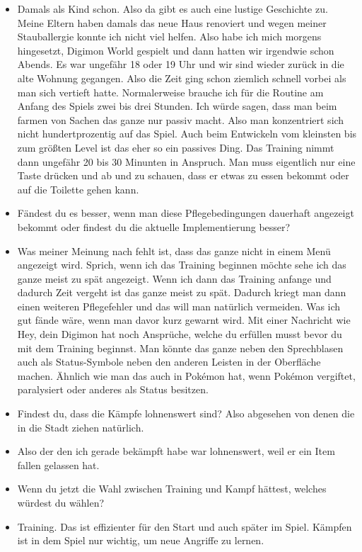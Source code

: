 {\begin{itemize}[]
    \item {} Damals als Kind schon. Also da gibt es auch eine lustige Geschichte zu. Meine Eltern haben damals das neue Haus renoviert und wegen meiner Stauballergie konnte ich nicht viel helfen. Also habe ich mich morgens hingesetzt, Digimon World gespielt und dann hatten wir irgendwie schon Abends. Es war ungefähr 18 oder 19 Uhr und wir sind wieder zurück in die alte Wohnung gegangen. Also die Zeit ging schon ziemlich schnell vorbei als man sich vertieft hatte. Normalerweise brauche ich für die Routine am Anfang des Spiels zwei bis drei Stunden. Ich würde sagen, dass man beim farmen von Sachen das ganze nur passiv macht. Also man konzentriert sich nicht hundertprozentig auf das Spiel. Auch beim Entwickeln vom kleinsten bis zum größten Level ist das eher so ein passives Ding. Das Training nimmt dann ungefähr 20 bis 30 Minunten in Anspruch. Man muss eigentlich nur eine Taste drücken und ab und zu schauen, dass er etwas zu essen bekommt oder auf die Toilette gehen kann. 
    \item {} Fändest du es besser, wenn man diese Pflegebedingungen dauerhaft angezeigt bekommt oder findest du die aktuelle Implementierung besser?
    \item {} Was meiner Meinung nach fehlt ist, dass das ganze nicht in einem Menü angezeigt wird. Sprich, wenn ich das Training beginnen möchte sehe ich das ganze meist zu spät angezeigt. Wenn ich dann das Training anfange und dadurch Zeit vergeht ist das ganze meist zu spät. Dadurch kriegt man dann einen weiteren Pflegefehler und das will man natürlich vermeiden. Was ich gut fände wäre, wenn man davor kurz gewarnt wird. Mit einer Nachricht wie \frq Hey, dein Digimon hat noch Ansprüche, welche du erfüllen musst bevor du mit dem Training beginnst\flq{}. Man könnte das ganze neben den Sprechblasen auch als Status-Symbole neben den anderen Leisten in der Oberfläche machen. Ähnlich wie man das auch in Pokémon hat, wenn Pokémon vergiftet, paralysiert oder anderes als Status besitzen. 
    \item {} Findest du, dass die Kämpfe lohnenswert sind? Also abgesehen von denen die in die Stadt ziehen natürlich.
    \item {} Also der den ich gerade bekämpft habe war lohnenswert, weil er ein Item fallen gelassen hat.
    \item {} Wenn du jetzt die Wahl zwischen Training und Kampf hättest, welches würdest du wählen? 
    \item {} Training. Das ist effizienter für den Start und auch später im Spiel. Kämpfen ist in dem Spiel nur wichtig, um neue Angriffe zu lernen.

\end{itemize}}
